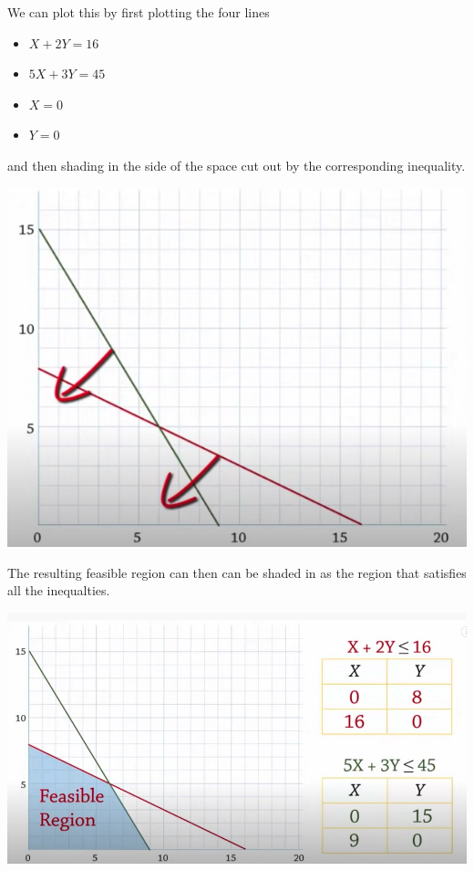 We can plot this by first plotting the four lines
\begin{itemize}
\item $X+2 Y = 16$
\item $5 X+3 Y = 45$
\item $X = 0$
\item $Y = 0$
\end{itemize}
and then shading in the side of the space cut out by the corresponding inequality.
\begin{center}
\includegraphics[scale = 0.4]{screenshots/example0-inequalities}
\end{center}

The resulting feasible region can then can be shaded in as the region that satisfies all the inequalties.

\begin{center}
\includegraphics[scale = 0.4]{screenshots/example0-feasible-region}
\end{center}

